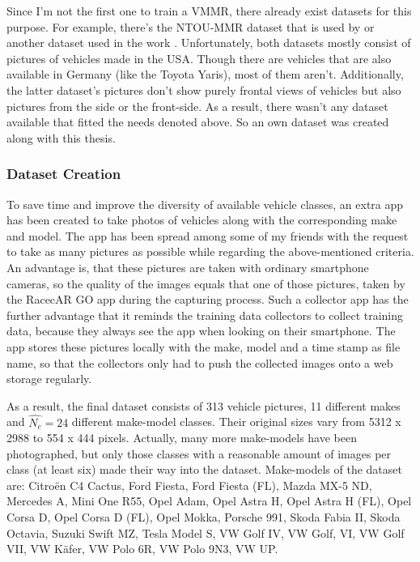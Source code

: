 Since I'm not the first one to train a VMMR, there already exist datasets for this purpose. For example, there's the NTOU-MMR dataset \citep{ntoummrDataset} that is used by \citep{siddiqui2016real} or another dataset used in the work \citep{krause20133d}. Unfortunately, both datasets mostly consist of pictures of vehicles made in the USA. Though there are vehicles that are also available in Germany (like the Toyota Yaris), most of them aren't. Additionally, the latter dataset's pictures don't show purely frontal views of vehicles but also pictures from the side or the front-side. As a result, there wasn't any dataset available that fitted the needs denoted above. So an own dataset was created along with this thesis.

\subsubsection{Dataset Creation}\label{sec:datasetCreation}
To save time and improve the diversity of available vehicle classes, an extra app has been created to take photos of vehicles along with the corresponding make and model. The app has been spread among some of my friends with the request to take as many pictures as possible while regarding the above-mentioned criteria. An advantage is, that these pictures are taken with ordinary smartphone cameras, so the quality of the images equals that one of those pictures, taken by the RacecAR GO app during the capturing process. Such a collector app has the further advantage that it reminds the training data collectors to collect training data, because they always see the app when looking on their smartphone. The app stores these pictures locally with the make, model and a time stamp as file name, so that the collectors only had to push the collected images onto a web storage regularly.

As a result, the final dataset consists of 313 vehicle pictures, 11 different makes and $\hat{N_c} = 24$ different make-model classes. Their original sizes vary from 5312 x 2988 to 554 x 444 pixels. Actually, many more make-models have been photographed, but only those classes with a reasonable amount of images per class (at least six) made their way into the dataset. Make-models of the dataset are: Citro\"en C4 Cactus, Ford Fiesta, Ford Fiesta (FL), Mazda MX-5 ND, Mercedes A, Mini One R55, Opel Adam, Opel Astra H, Opel Astra H (FL), Opel Corsa D, Opel Corsa D (FL), Opel Mokka, Porsche 991, Skoda Fabia II, Skoda Octavia, Suzuki Swift MZ, Tesla Model S, VW Golf IV, VW Golf, VI, VW Golf VII, VW K\"afer, VW Polo 6R, VW Polo 9N3, VW UP.

